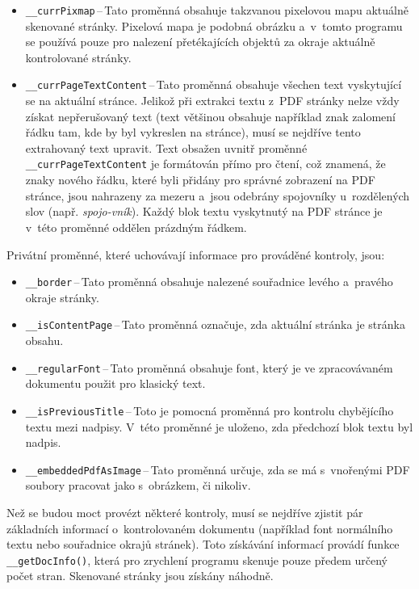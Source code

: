 \begin{itemize}
    \item \texttt{\_\_currPixmap}\,--\,Tato proměnná obsahuje takzvanou pixelovou
    mapu aktuálně skenované stránky. Pixelová mapa je podobná obrázku a~v~tomto
    programu se používá pouze pro nalezení přetékajících objektů za okraje
    aktuálně kontrolované stránky.
    
    \item \texttt{\_\_currPageTextContent}\,--\,Tato proměnná obsahuje
    všechen text vyskytující se na aktuální stránce. Jelikož při extrakci textu
    z~PDF stránky nelze vždy získat nepřerušovaný text (text většinou obsahuje
    například znak zalomení řádku tam, kde by byl vykreslen na stránce), 
    musí se nejdříve tento extrahovaný text upravit.
    Text obsažen uvnitř proměnné \texttt{\_\_currPageTextContent} je formátován
    přímo pro čtení, což znamená, že znaky nového řádku, které byli přidány pro správné 
    zobrazení na PDF stránce, jsou nahrazeny za mezeru a~jsou odebrány
    spojovníky u~rozdělených slov (např. \emph{spojo-vník}). Každý blok textu
    vyskytnutý na PDF stránce je v~této proměnné
    oddělen prázdným řádkem. 
\end{itemize}
Privátní proměnné, které uchovávají informace pro prováděné kontroly, jsou: 
\begin{itemize}
    \item \texttt{\_\_border}\,--\,Tato proměnná obsahuje nalezené souřadnice 
    levého a~pravého okraje stránky.
    \item \texttt{\_\_isContentPage}\,--\,Tato proměnná
    označuje, zda aktuální stránka je stránka obsahu.
    \item \texttt{\_\_regularFont}\,--\,Tato proměnná obsahuje
    font, který je ve zpracovávaném dokumentu použit pro klasický text.
    \item \texttt{\_\_isPreviousTitle}\,--\,Toto je pomocná proměnná pro
    kontrolu chybějícího textu mezi nadpisy. V~této proměnné je uloženo,
    zda předchozí blok textu byl nadpis.
    \item \texttt{\_\_embeddedPdfAsImage}\,--\,Tato proměnná určuje, zda se
    má s~vnořenými PDF soubory pracovat jako s~obrázkem, či nikoliv.
\end{itemize} 

Než se budou moct provézt některé kontroly, musí se nejdříve zjistit pár
základních informací o~kontrolovaném dokumentu (například font normálního textu
nebo souřadnice okrajů stránek). Toto získávání informací provádí funkce
\texttt{\_\_getDocInfo()}, která pro zrychlení programu skenuje pouze předem
určený počet stran. Skenované stránky jsou získány náhodně.

